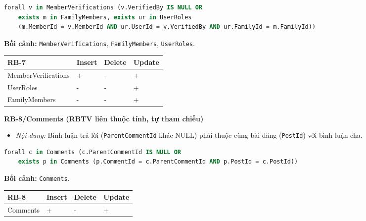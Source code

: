 \begin{lstlisting}[language=SQL]
	forall v in MemberVerifications (v.VerifiedBy IS NULL OR
	exists m in FamilyMembers, exists ur in UserRoles
	(m.MemberId = v.MemberId AND ur.UserId = v.VerifiedBy AND ur.FamilyId = m.FamilyId))
\end{lstlisting}
\noindent\textbf{Bối cảnh:} \texttt{MemberVerifications}, \texttt{FamilyMembers}, \texttt{UserRoles}.

\vspace{0.4em}
{\centering
	\renewcommand{\arraystretch}{1.2}
	\begin{tabular}{|>{\raggedright\arraybackslash}p{}|>{\centering\arraybackslash}p{}|>{\centering\arraybackslash}p{}|>{\centering\arraybackslash}p{}|}
		\hline
		\textbf{RB-7} & \textbf{Insert} & \textbf{Delete} & \textbf{Update} \\ \hline
		MemberVerifications & + & - & + \\ \hline
		UserRoles & - & - & + \\ \hline
		FamilyMembers & - & - & + \\ \hline
	\end{tabular}\par}

\vspace{1.0em}
\textbf{RB-8/Comments (RBTV liên thuộc tính, tự tham chiếu)}
\begin{itemize}
	\item \emph{Nội dung:} Bình luận trả lời (\texttt{ParentCommentId} khác NULL) phải thuộc cùng bài đăng (\texttt{PostId}) với bình luận cha.
\end{itemize}

\begin{lstlisting}[language=SQL]
	forall c in Comments (c.ParentCommentId IS NULL OR
	exists p in Comments (p.CommentId = c.ParentCommentId AND p.PostId = c.PostId))
\end{lstlisting}
\noindent\textbf{Bối cảnh:} \texttt{Comments}.

\vspace{0.4em}
{\centering
	\renewcommand{\arraystretch}{1.2}
	\begin{tabular}{|>{\raggedright\arraybackslash}p{}|>{\centering\arraybackslash}p{}|>{\centering\arraybackslash}p{}|>{\centering\arraybackslash}p{}|}
		\hline
		\textbf{RB-8} & \textbf{Insert} & \textbf{Delete} & \textbf{Update} \\ \hline
		Comments & + & - & + \\ \hline
	\end{tabular}\par}

